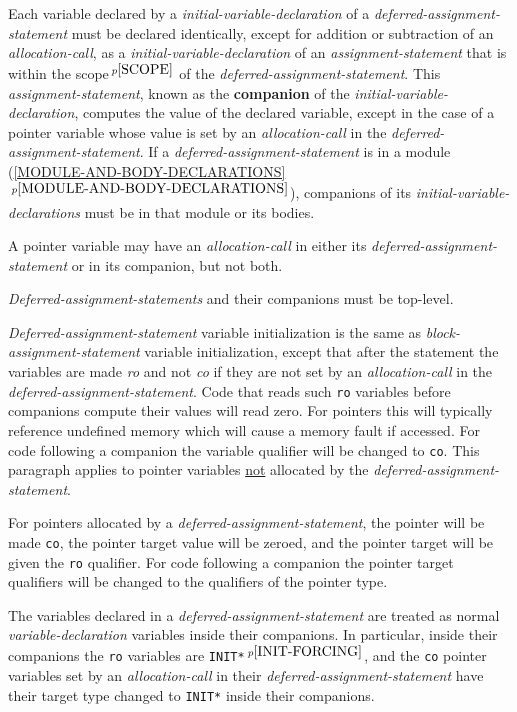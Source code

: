 \documentclass[12pt]{article}
\newcommand{\key}[1]{{\rm \bfseries #1}}
\newcommand{\itemref}[1]{\ref{#1}$\,^{p\pageref{#1}}$}
\newcommand{\pagnote}[1]{$\,^{p\pageref{#1}}$}
\begin{document}
Each variable declared by a {\em initial-variable-declaration}
of a {\em deferred-assignment-statement} must be declared identically,
except for addition or subtraction of an {\em allocation-call},
as a {\em initial-variable-declaration} of an {\em assignment-statement}
that is within the scope\pagnote{SCOPE} of the
{\em deferred-assignment-statement}.  This {\em assignment-statement},
known as the \key{companion} of the {\em initial-variable-declaration},
computes the value of the
declared variable, except in the case of a pointer variable whose value is
set by an {\em allocation-call} in the {\em deferred-assignment-statement}.
If a {\em deferred-assignment-statement} is in a module
(\itemref{MODULE-AND-BODY-DECLARATIONS}), companions
of its {\em initial-variable-declarations}
must be in that module or its bodies.

A pointer variable may have an {\em allocation-call} in either its
{\em deferred-assignment-statement} or in its companion, but not
both.

{\em Deferred-assignment-statements} and their companions must be
top-level.

{\em Deferred-assignment-statement} variable initialization is the
same as {\em block-assignment-state\-ment} variable initialization,
except that after the statement the variables
are made {\em ro} and not {\em co} if they are not set
by an {\em allocation-call} in the {\em deferred-assignment-statement}.
Code that reads such {\tt ro} variables
before companions compute their values will
read zero.
For pointers this will typically reference undefined memory which
will cause a memory fault if accessed.
For code following a companion the
variable qualifier will be changed to {\tt co}.
This paragraph applies to pointer variables \underline{not} allocated by the
{\em deferred-assignment-statement}.


For pointers allocated by a {\em deferred-assignment-statement},
the pointer will be made {\tt co},
the pointer target value will be zeroed, and
the pointer target will be given the {\tt ro} qualifier.
For code following a companion the
pointer target qualifiers will be changed
to the qualifiers of the pointer type.


The variables declared in a {\em deferred-assignment-statement} are treated as
normal {\em vari\-able-declaration} variables inside their companions.
In particular, inside their companions
the {\tt ro} variables are {\tt *INIT*}\pagnote{INIT-FORCING},
and the {\tt co} pointer variables set by
an {\em allocation-call} in their {\em deferred-assignment-statement}
have their target type changed to {\tt *INIT*}
inside their companions.
\end{document}
